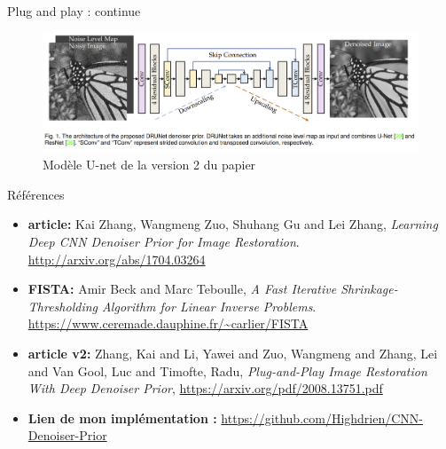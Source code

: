 \documentclass[11pt]{beamer}
\begin{document}
\begin{frame}{Plug and play : continue}
    \begin{figure}[b]
        \centering
        \includegraphics[width=\textwidth]{../paper/model_v2.png}
        \caption{Modèle U-net de la version 2 du papier}
    \end{figure}
\end{frame}

\begin{frame}{Références}
    \begin{itemize}
        \item \textbf{article:} Kai Zhang, Wangmeng Zuo, Shuhang Gu and Lei Zhang, 
            \textit{Learning Deep {CNN} Denoiser Prior for Image Restoration}.
            \url{http://arxiv.org/abs/1704.03264}
        \item \textbf{FISTA:} Amir Beck and Marc Teboulle, \textit{A Fast Iterative Shrinkage-Thresholding 
        Algorithm for Linear Inverse Problems}. \url{https://www.ceremade.dauphine.fr/~carlier/FISTA}
        \item \textbf{article v2:} Zhang, Kai and Li, Yawei and Zuo, Wangmeng and Zhang, Lei and Van Gool, Luc and Timofte, Radu,
            \textit{Plug-and-Play Image Restoration With Deep Denoiser Prior}, \url{https://arxiv.org/pdf/2008.13751.pdf}
        \item \textbf{Lien de mon implémentation :} \url{https://github.com/Highdrien/CNN-Denoiser-Prior}
    \end{itemize}
    
\end{frame}
\end{document}
